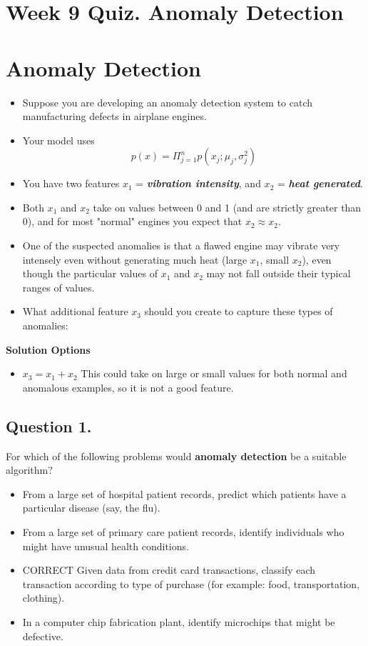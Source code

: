 \documentclass[11pt]{article} %
\begin{document}
\section{Week 9 Quiz. Anomaly Detection}
\section*{Anomaly Detection}
\begin{itemize}
	\item Suppose you are developing an anomaly detection system to catch manufacturing defects in airplane engines. 
	\item Your model uses
	{ 
		\Large
		\[p(x)= \Pi ^{n}_{j=1} p(x_j;\mu_j,\sigma^2_j)\] 
	}
	\item You have two features $x_1$ = \textit{\textbf{vibration intensity}}, and $x_2$ = \textit{\textbf{heat generated}}. 
	\item Both $x_1$ and $x_2$ take on values between 0 and 1 (and are strictly greater than 0), and for most "normal" engines you expect that $x_2 \approx x_2$. 
	\item One of the suspected anomalies is that a flawed engine may vibrate very intensely even without generating much heat (large $x_1$, small $x_2$), 
	even though the particular values of $x_1$ and $x_2$ may not fall outside their typical ranges of values. 
	\item What additional feature $x_3$ should you create to capture these types of anomalies:
\end{itemize}
\textbf{Solution Options}
\begin{itemize}
	\item $x_3=x_1+x_2$	This could take on large or small values for both normal and anomalous examples, so it is not a good feature.
\end{itemize}


\subsection*{Question 1. }
For which of the following problems would \textbf{anomaly detection} be a suitable algorithm?

\begin{itemize}
	\item From a large set of hospital patient records, predict which patients have a particular disease (say, the flu).
	\item From a large set of primary care patient records, identify individuals who might have unusual health conditions.
	\item CORRECT
	Given data from credit card transactions, classify each transaction according to type of purchase (for example: food, transportation, clothing).
	\item 
	In a computer chip fabrication plant, identify microchips that might be defective.
\end{itemize}
\end{document}
